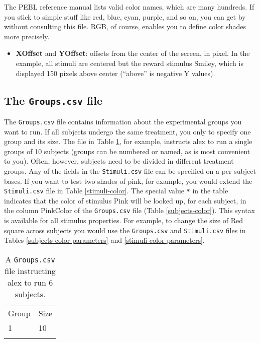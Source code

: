 \documentclass[11pt,]{article}
\renewcommand{\medskip}{}
\begin{document}
The PEBL reference manual lists valid color names, which are many
hundreds. If you stick to simple stuff like red, blue, cyan, purple, and
so on, you can get by without consulting this file. RGB, of course,
enables you to define color shades more precisely.

\begin{itemize}
\itemsep1pt\parskip0pt
\item
  \textbf{XOffset} and \textbf{YOffset}: offsets from the center of the
  screen, in pixel. In the example, all stimuli are centered but the
  reward stimulus Smiley, which is displayed 150 pixels above center
  (``above'' is negative Y values).
\end{itemize}

\subsection{The \texttt{Groups.csv} file}

The \texttt{Groups.csv} file contains information about the experimental
groups you want to run. If all subjects undergo the same treatment, you
only to specify one group and its size. The file in Table
\ref{subjects}, for example, instructs alex to run a single groups of 10
subjects (groups can be numbered or named, as is most convenient to
you). Often, however, subjects need to be divided in different treatment
groups. Any of the fields in the \texttt{Stimuli.csv} file can be
specified on a per-subject bases. If you want to test two shades of
pink, for example, you would extend the \texttt{Stimuli.csv} file in
Table \ref{stimuli-color}. The special value \texttt{*} in the table
indicates that the color of stimulus Pink will be looked up, for each
subject, in the column PinkColor of the \texttt{Groups.csv} file (Table
\ref{subjects-color}). This syntax is available for all stimulus
properties. For example, to change the size of Red square across
subjects you would use the \texttt{Groups.csv} and \texttt{Stimuli.csv}
files in Tables \ref{subjects-color-parameters} and
\ref{stimuli-color-parameters}.

\begin{longtable}[c]{@{}ll@{}}
\hline\noalign{\medskip}
Group & Size
\\\noalign{\medskip}
\hline\noalign{\medskip}
1 & 10
\\\noalign{\medskip}
\hline
\noalign{\medskip}
\caption{A \texttt{Groups.csv} file instructing alex to run 6 subjects.
\label{subjects}}
\end{longtable}
\end{document}
